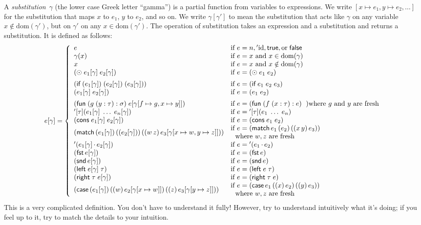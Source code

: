 \documentclass{homework}
\begin{document}
A \emph{substitution}~$\gamma$ (the lower case Greek letter ``gamma'')  is a partial function from variables to expressions.
We write $[x \mapsto e_1, y \mapsto e_2, \ldots]$ for the substitution that maps $x$ to $e_1$, $y$ to $e_2$, and so on.
We write $\gamma[\gamma']$ to mean the substitution that acts like $\gamma$ on any variable $x \notin\text{dom}(\gamma')$, but on $\gamma'$ on any $x \in \text{dom}(\gamma')$.
The operation of substitution takes an expression and a substitution and returns a substitution.
It is defined as follows:
$$
e[\gamma] = \left\{
  \begin{array}{l l}
    e & \text{if}~e = n, {}'\text{id}, \textsf{true}, \mathrel{\text{or}} \textsf{false}\\
    \gamma(x) & \text{if}~e=x~\text{and}~x \in \text{dom}(\gamma)\\
    x & \text{if}~e=x~\text{and}~x \notin \text{dom}(\gamma)\\
    (\odot\; e_1[\gamma]\; e_2[\gamma]) & \text{if}~e=(\odot\; e_1\; e_2) \\[0.5em]
    (\textsf{if}\;(e_1[\gamma])\;(e_2[\gamma])\;(e_3[\gamma])) & \text{if}~e = (\textsf{if}\;e_1\;e_2\;e_3)\\
    (e_1[\gamma]\; e_2[\gamma]) & \text{if}~e=(e_1\; e_2) \\[0.5em]
    (\textsf{fun}\; (g\;(y : \tau) \mathrel{:} \sigma)\; e[\gamma[f \mapsto g, x \mapsto y]]) & \text{if}~e=(\textsf{fun}\; (f\;(x : \tau) \mathrel{:} e)\; ~)\text{where $g$ and $y$ are fresh}\\
    {}'[\tau](e_1[\gamma]\;\ldots\;e_n[\gamma]) & \text{if}~e={}'[\tau](e_1\;\ldots\;e_n)\\
    (\textsf{cons}\;e_1[\gamma]\;e_2[\gamma]) & \text{if}~e=(\textsf{cons}\;e_1\;e_2)\\
    (\textsf{match}\,(e_1[\gamma])\,((e_2[\gamma]))\,((w\,z)\,e_3[\gamma[x \mapsto w, y \mapsto z]])) & \!\!\!\begin{array}{l}\text{if}~e=(\textsf{match}\,e_1\,(e_2)\,((x\,y)\,e_3))\\~~\text{where}~w,z~\text{are fresh}\end{array}\\
    {}'(e_1[\gamma] \mathop{.} e_2[\gamma]) & \text{if}~e={}'(e_1 \mathop{.} e_2)\\
    (\textsf{fst}\,e[\gamma]) & \text{if}~e=(\textsf{fst}\,e)\\
    (\textsf{snd}\,e[\gamma]) & \text{if}~e=(\textsf{snd}\,e)\\
    (\textsf{left}\;e[\gamma]\;\tau) & \text{if}~e=(\textsf{left}\;e\;\tau)\\
    (\textsf{right}\;\tau\;e[\gamma]) & \text{if}~e=(\textsf{right}\;\tau\;e)\\
    (\textsf{case}\,(e_1[\gamma])\,((w)\,e_2[\gamma[x \mapsto w]])\,((z)\,e_3[\gamma[y \mapsto z]])) & \!\!\!\begin{array}{l}\text{if}~e=(\textsf{case}\,e_1\,((x)\,e_2)\,((y)\,e_3))\\~~\text{where}~w,z~\text{are fresh}\end{array}
  \end{array}
\right.
$$
This is a very complicated definition.
You don't have to understand it fully!
However, try to understand intuitively what it's doing; if you feel up to it, try to match the details to your intuition.
\end{document}
